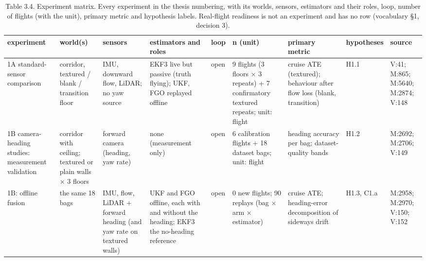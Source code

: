 \begin{table}[htbp]
\centering
\scriptsize
\caption{Table 3.4. Experiment matrix. Every experiment in the thesis numbering, with its worlds, sensors, estimators and their roles, loop, number of flights (with the unit), primary metric and hypothesis labels. Real-flight readiness is not an experiment and has no row (vocabulary \S{}1, decision 3).}
\label{tab:3-4}
\begin{tabular}{p{}p{}p{}p{}p{}p{}p{}p{}p{}}
\toprule
\textbf{experiment} & \textbf{world(s)} & \textbf{sensors} & \textbf{estimators and roles} & \textbf{loop} & \textbf{n (unit)} & \textbf{primary metric} & \textbf{hypotheses} & \textbf{source} \\
\midrule
1A standard-sensor comparison & corridor, textured / blank / transition floor & IMU, downward flow, LiDAR; no yaw source & EKF3 live but passive (truth flying); UKF, FGO replayed offline & open & 9 flights (3 floors $\times$ 3 repeats) + 7 confirmatory textured repeats; unit: flight & cruise ATE (textured); behaviour after flow loss (blank, transition) & H1.1 & V:41; M:865; M:5640; M:2874; V:148 \\
1B camera-heading studies: measurement validation & corridor with ceiling; textured or plain walls $\times$ 3 floors & forward camera (heading, yaw rate) & none (measurement only) & open & 6 calibration flights + 18 dataset bags; unit: flight & heading accuracy per bag; dataset-quality bands & H1.2 & M:2692; M:2706; V:149 \\
1B: offline fusion & the same 18 bags & IMU, flow, LiDAR + forward heading (and yaw rate on textured walls) & UKF and FGO offline, each with and without the heading; EKF3 the no-heading reference & open & 0 new flights; 90 replays (bag $\times$ arm $\times$ estimator) & cruise ATE; heading-error decomposition of sideways drift & H1.3, C1.a & M:2958; M:2970; V:150; V:152 \\

\end{tabular}
\end{table}
